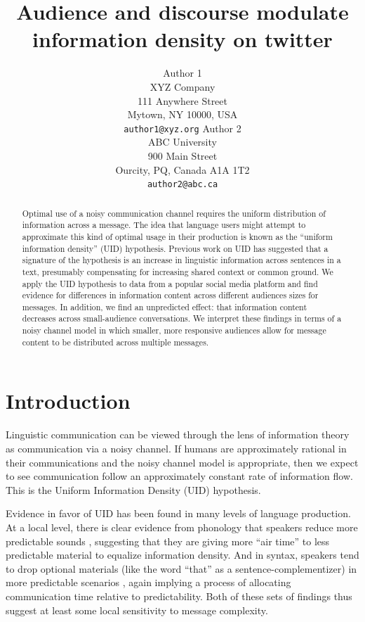 \documentclass[11pt,letterpaper]{article}
\title{Audience and discourse modulate information density on twitter\Thanks{Thanks to...}}
\author{Author 1\\
XYZ Company\\
111 Anywhere Street\\
Mytown, NY 10000, USA\\
{\tt author1@xyz.org}
	  \And
          Author 2\\
ABC University\\
900 Main Street\\
Ourcity, PQ, Canada A1A 1T2\\
{\tt author2@abc.ca}
}
\date{}
\begin{document}
\maketitle
\begin{abstract}
Optimal use of a noisy communication channel requires the uniform distribution of information across a message. The idea that language users might attempt to approximate this kind of optimal usage in their production is known as the ``uniform information density'' (UID) hypothesis. Previous work on UID has suggested that a signature of the hypothesis is an  increase in linguistic information across sentences in a text, presumably compensating for increasing shared context or common ground. We apply the UID hypothesis to data from a popular social media platform and find evidence for differences in information content across different audiences sizes for messages. In addition, we find an unpredicted effect: that information content decreases across small-audience conversations. We interpret these findings in terms of a noisy channel model in which smaller, more responsive audiences allow for message content to be distributed across multiple messages. 


\end{abstract}

\section{Introduction}

Linguistic communication can be viewed through the lens of information theory as communication via a noisy channel.  If humans are approximately rational in their communications and the noisy channel model is appropriate, then we expect to see communication follow an approximately constant rate of information flow.  This is the Uniform Information Density (UID) hypothesis.

Evidence in favor of UID has been found in many levels of language production. At a local level, there is clear evidence from phonology that speakers reduce more predictable sounds \cite{aylett2004,aylett2006,bell2003}, suggesting that they are giving more ``air time'' to less predictable material to equalize information density. And in syntax, speakers tend to drop optional materials (like the word ``that'' as a sentence-complementizer) in more predictable scenarios \cite{levy2007,frank2008,jaeger2010}, again implying a process of allocating communication time relative to predictability. Both of these sets of findings thus suggest at least some local sensitivity to message complexity.
\end{document}
